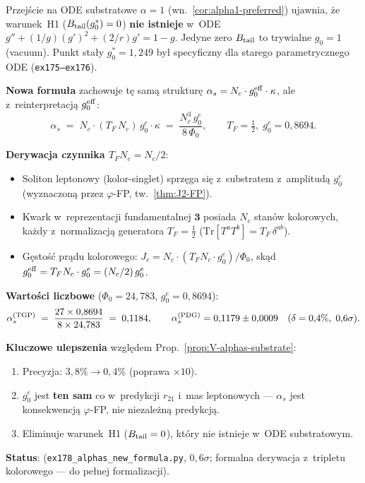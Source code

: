 \begin{remark}[Aktualizacja: nowa formu\l{}a $\alpha_s$ z~ODE substratowym
$\alpha = 1$ (sesja~v45)]%
\label{rem:V-alphas-alpha1}
Przej\'scie na ODE substratowe $\alpha = 1$
(wn.~\ref{cor:alpha1-preferred}) ujawnia, \.ze warunek~H1
($B_{\rm tail}(g_0^*) = 0$) \textbf{nie istnieje} w~ODE
$g'' + (1/g)(g')^2 + (2/r)g' = 1-g$.
Jedyne zero $B_{\rm tail}$ to trywialne $g_0 = 1$ (vacuum).
Punkt sta\l{}y $g_0^* = 1{,}249$ by\l{} specyficzny dla starego
parametrycznego ODE (\texttt{ex175--ex176}).

\textbf{Nowa formu\l{}a} zachowuje t\k{e} sam\k{a} struktur\k{e}
$\alpha_s = N_c \cdot g_0^{\rm eff} \cdot \kappa$,
ale z~reinterpretacj\k{a} $g_0^{\rm eff}$:
\begin{equation}\label{eq:V-alphas-new}
  \alpha_s
  \;=\;
  N_c \cdot (T_F\,N_c)\,g_0^e \cdot \kappa
  \;=\;
  \frac{N_c^3\,g_0^e}{8\,\Phi_0},
  \qquad
  T_F = \tfrac{1}{2},\; g_0^e = 0{,}8694.
\end{equation}

\textbf{Derywacja czynnika $T_F N_c = N_c/2$}:
\begin{itemize}[nosep]
  \item Soliton leptonowy (kolor-singlet) sprz\k{e}ga si\k{e}
    z~substratem z~amplitud\k{a} $g_0^e$ (wyznaczon\k{a} przez
    $\varphi$-FP, tw.~\ref{thm:J2-FP}).
  \item Kwark w~reprezentacji fundamentalnej $\mathbf{3}$ posiada
    $N_c$ stan\'ow kolorowych, ka\.zdy z~normalizacj\k{a} generatora
    $T_F = \tfrac{1}{2}$ ($\mathrm{Tr}[T^a T^b] = T_F\,\delta^{ab}$).
  \item G\k{e}sto\'s\'c pr\k{a}du kolorowego: $J_c = N_c \cdot
    (T_F N_c \cdot g_0^e)/\Phi_0$, sk\k{a}d
    $g_0^{\rm eff} = T_F N_c \cdot g_0^e = (N_c/2)\,g_0^e$.
\end{itemize}

\textbf{Warto\'sci liczbowe} ($\Phi_0 = 24{,}783$, $g_0^e = 0{,}8694$):
\[
  \alpha_s^{\rm (TGP)}
  \;=\; \frac{27 \times 0{,}8694}{8 \times 24{,}783}
  \;=\; 0{,}1184,
  \qquad
  \alpha_s^{\rm (PDG)} = 0{,}1179 \pm 0{,}0009
  \quad (\delta = 0{,}4\%,\; 0{,}6\sigma).
\]

\textbf{Kluczowe ulepszenia} wzgl\k{e}dem Prop.~\ref{prop:V-alphas-substrate}:
\begin{enumerate}[nosep]
  \item Precyzja: $3{,}8\% \to 0{,}4\%$ (poprawa $\times 10$).
  \item $g_0^e$ jest \textbf{ten sam} co w~predykcji $r_{21}$
    i~mas leptonowych --- $\alpha_s$ jest konsekwencj\k{a}
    $\varphi$-FP, nie niezale\.zn\k{a} predykcj\k{a}.
  \item Eliminuje warunek~H1 ($B_{\rm tail} = 0$), kt\'ory nie
    istnieje w~ODE substratowym.
\end{enumerate}

\textbf{Status}: 
(\texttt{ex178\_alphas\_new\_formula.py}, $0{,}6\sigma$;
formalna derywacja z~tripletu kolorowego --- do pe\l{}nej
formalizacji).
\end{remark}

